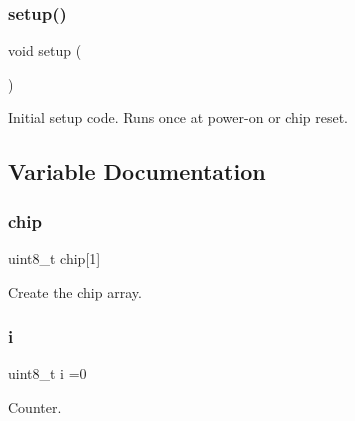 \subsubsection{\texorpdfstring{setup()}{setup()}}
{\footnotesize\ttfamily void setup (\begin{DoxyParamCaption}{ }\end{DoxyParamCaption})}



Initial setup code. Runs once at power-\/on or chip reset. 



\subsection{Variable Documentation}
\mbox{\label{SN74__Count_8ino_a089fa212b87b3656b0a264a5e4457d8e}} 
\subsubsection{\texorpdfstring{chip}{chip}}
{\footnotesize\ttfamily uint8\+\_\+t chip\mbox{[}1\mbox{]}}



Create the chip array. 

\mbox{\label{SN74__Count_8ino_af27e3188294c2df66d975b74a09c001d}} 
\subsubsection{\texorpdfstring{i}{i}}
{\footnotesize\ttfamily uint8\+\_\+t i =0}



Counter. 

